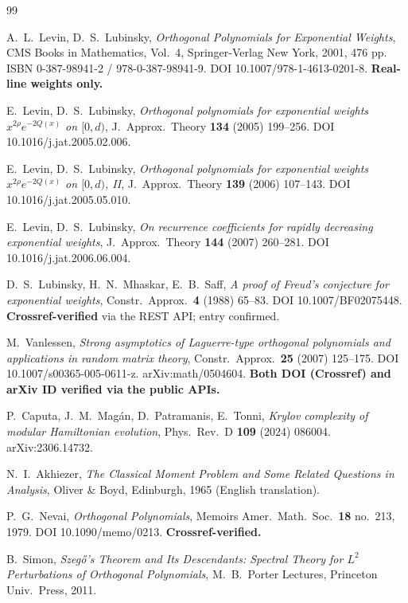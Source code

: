 \documentclass[11pt]{article}
\theoremstyle{definition}
\begin{document}
\begin{thebibliography}{99}

 A.\ L.\ Levin, D.\ S.\ Lubinsky,
\emph{Orthogonal Polynomials for Exponential Weights}, CMS Books in
Mathematics, Vol.\ 4, Springer-Verlag New York, 2001, 476 pp.
ISBN 0-387-98941-2 / 978-0-387-98941-9. DOI 10.1007/978-1-4613-0201-8.
\textbf{Real-line weights only.}

 E.\ Levin, D.\ S.\ Lubinsky,
\emph{Orthogonal polynomials for exponential weights $x^{2\rho}e^{-2Q(x)}$
on $[0,d)$}, J.\ Approx.\ Theory \textbf{134} (2005) 199--256.
DOI 10.1016/j.jat.2005.02.006.

 E.\ Levin, D.\ S.\ Lubinsky,
\emph{Orthogonal polynomials for exponential weights $x^{2\rho}e^{-2Q(x)}$
on $[0,d)$, II}, J.\ Approx.\ Theory \textbf{139} (2006) 107--143.
DOI 10.1016/j.jat.2005.05.010.

 E.\ Levin, D.\ S.\ Lubinsky,
\emph{On recurrence coefficients for rapidly decreasing exponential
weights}, J.\ Approx.\ Theory \textbf{144} (2007) 260--281.
DOI 10.1016/j.jat.2006.06.004.

 D.\ S.\ Lubinsky, H.\ N.\ Mhaskar, E.\ B.\ Saff,
\emph{A proof of Freud's conjecture for exponential weights},
Constr.\ Approx.\ \textbf{4} (1988) 65--83. DOI 10.1007/BF02075448.
\textbf{Crossref-verified} via the REST API; entry confirmed.

 M.\ Vanlessen,
\emph{Strong asymptotics of Laguerre-type orthogonal polynomials and
applications in random matrix theory}, Constr.\ Approx.\ \textbf{25}
(2007) 125--175. DOI 10.1007/s00365-005-0611-z. arXiv:math/0504604.
\textbf{Both DOI (Crossref) and arXiv ID verified via the public APIs.}

 P.\ Caputa, J.\ M.\ Mag\'an, D.\ Patramanis, E.\ Tonni,
\emph{Krylov complexity of modular Hamiltonian evolution},
Phys.\ Rev.\ D \textbf{109} (2024) 086004. arXiv:2306.14732.

 N.\ I.\ Akhiezer,
\emph{The Classical Moment Problem and Some Related Questions in Analysis},
Oliver \& Boyd, Edinburgh, 1965 (English translation).

 P.\ G.\ Nevai,
\emph{Orthogonal Polynomials}, Memoirs Amer.\ Math.\ Soc.\
\textbf{18} no.\ 213, 1979. DOI 10.1090/memo/0213.
\textbf{Crossref-verified.}

 B.\ Simon,
\emph{Szeg\H{o}'s Theorem and Its Descendants: Spectral Theory for
$L^2$ Perturbations of Orthogonal Polynomials}, M.\ B.\ Porter Lectures,
Princeton Univ.\ Press, 2011.


\end{thebibliography}
\end{document}

